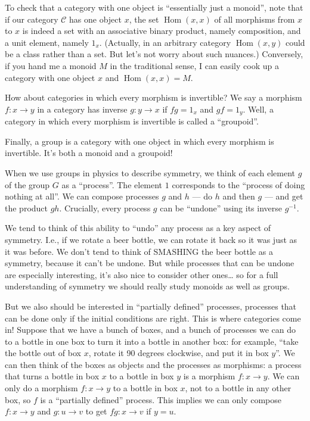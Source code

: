 \documentclass{article}
\begin{document}
To check that a category with one object is ``essentially just a
monoid'', note that if our category \(\mathcal{C}\) has one object
\(x\), the set \(\operatorname{Hom}(x,x)\) of all morphisms from \(x\)
to \(x\) is indeed a set with an associative binary product, namely
composition, and a unit element, namely \(1_x\). (Actually, in an
arbitrary category \(\operatorname{Hom}(x,y)\) could be a class rather
than a set. But let's not worry about such nuances.) Conversely, if you
hand me a monoid \(M\) in the traditional sense, I can easily cook up a
category with one object \(x\) and \(\operatorname{Hom}(x,x) = M\).

How about categories in which every morphism is invertible? We say a
morphism \(f\colon x\to y\) in a category has inverse \(g\colon y\to x\)
if \(fg = 1_x\) and \(gf = 1_y\). Well, a category in which every
morphism is invertible is called a ``groupoid''.

Finally, a group is a category with one object in which every morphism
is invertible. It's both a monoid and a groupoid!

When we use groups in physics to describe symmetry, we think of each
element \(g\) of the group \(G\) as a ``process''. The element \(1\)
corresponds to the ``process of doing nothing at all''. We can compose
processes \(g\) and \(h\) --- do \(h\) and then \(g\) --- and get the
product \(gh\). Crucially, every process \(g\) can be ``undone'' using
its inverse \(g^{-1}\).

We tend to think of this ability to ``undo'' any process as a key aspect
of symmetry. I.e., if we rotate a beer bottle, we can rotate it back so
it was just as it was before. We don't tend to think of SMASHING the
beer bottle as a symmetry, because it can't be undone. But while
processes that can be undone are especially interesting, it's also nice
to consider other ones\ldots{} so for a full understanding of symmetry
we should really study monoids as well as groups.

But we also should be interested in ``partially defined'' processes,
processes that can be done only if the initial conditions are right.
This is where categories come in! Suppose that we have a bunch of boxes,
and a bunch of processes we can do to a bottle in one box to turn it
into a bottle in another box: for example, ``take the bottle out of box
\(x\), rotate it 90 degrees clockwise, and put it in box \(y\)''. We can
then think of the boxes as objects and the processes as morphisms: a
process that turns a bottle in box \(x\) to a bottle in box \(y\) is a
morphism \(f\colon x\to y\). We can only do a morphism
\(f\colon x\to y\) to a bottle in box \(x\), not to a bottle in any
other box, so \(f\) is a ``partially defined'' process. This implies we
can only compose \(f\colon x\to y\) and \(g\colon u \to v\) to get
\(fg\colon x \to v\) if \(y = u\).
\end{document}

